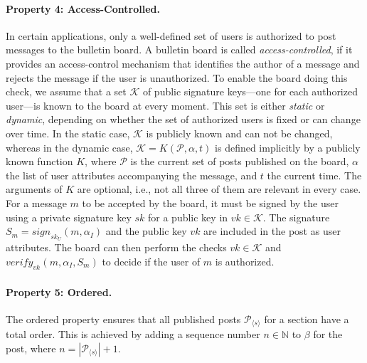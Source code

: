 \documentclass[bibtotoc,halfparskip,oneside]{scrreprt}
\newcommand{\vk}[1]{\mathit{vk}_{#1}\xspace}
\begin{document}
	\paragraph*{Property 4: Access-Controlled.}
	
	In certain applications, only a well-defined set of users is authorized to post messages to the bulletin board. A bulletin board is called \emph{access-controlled}, if it provides an access-control mechanism that identifies the author of a message and rejects the message if the user is unauthorized. To enable the board doing this check, we assume that a set $\mathcal{K}$ of public signature keys---one for each authorized user---is known to the board at every moment. This set is either \emph{static} or \emph{dynamic}, depending on whether the set of authorized users is fixed or can change over time. In the static case, $\mathcal{K}$ is publicly known and can not be changed, whereas in the dynamic case, $\mathcal{K}=K(\mathcal{P}, \alpha, t)$ is defined implicitly by a publicly known function $K$, where $\mathcal{P}$ is the current set of posts published on the board, $\alpha$ the list of user attributes accompanying the message, and $t$ the current time. The arguments of $K$ are optional, i.e., not all three of them are relevant in every case. For a message $m$ to be accepted by the board, it must be signed by the user using a private signature key $sk$ for a public key in $vk\in\mathcal{K}$. The signature $S_m=\mathit{sign}_{sk_U}(m, \alpha_I)$ and the public key $vk$ are included in the post as user attributes. The board can then perform the checks $vk\in\mathcal{K}$ and $\mathit{verify}_{\vk{}}(m,\alpha_I,S_m)$ to decide if the user of $m$ is authorized.
	
	\paragraph*{Property 5: Ordered.}
	
	The ordered property ensures that all published posts $\mathcal{P}_{\langle s\rangle}$ for a section have a total order. This is achieved by adding a sequence number $n\in\mathbb{N}$ to $\beta$ for the post, where $n=|\mathcal{P}_{\langle s\rangle}|+1$.
	
\end{document}
